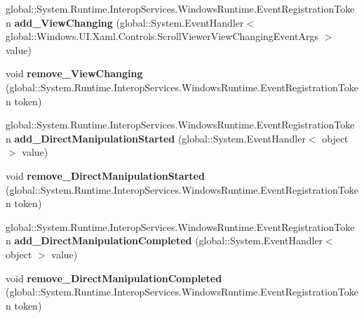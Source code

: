 \begin{DoxyCompactItemize}
global\+::\+System.\+Runtime.\+Interop\+Services.\+Windows\+Runtime.\+Event\+Registration\+Token {\bfseries add\+\_\+\+View\+Changing} (global\+::\+System.\+Event\+Handler$<$ global\+::\+Windows.\+U\+I.\+Xaml.\+Controls.\+Scroll\+Viewer\+View\+Changing\+Event\+Args $>$ value)
\item 
\mbox{\label{class_windows_1_1_u_i_1_1_xaml_1_1_controls_1_1_scroll_viewer_a4ab42f006f295d28bd3080f99f149352}} 
void {\bfseries remove\+\_\+\+View\+Changing} (global\+::\+System.\+Runtime.\+Interop\+Services.\+Windows\+Runtime.\+Event\+Registration\+Token token)
\item 
\mbox{\label{class_windows_1_1_u_i_1_1_xaml_1_1_controls_1_1_scroll_viewer_adab47141d357f03365676f3c0dc8360c}} 
global\+::\+System.\+Runtime.\+Interop\+Services.\+Windows\+Runtime.\+Event\+Registration\+Token {\bfseries add\+\_\+\+Direct\+Manipulation\+Started} (global\+::\+System.\+Event\+Handler$<$ object $>$ value)
\item 
\mbox{\label{class_windows_1_1_u_i_1_1_xaml_1_1_controls_1_1_scroll_viewer_a34f553f86c580da23d4109f5e64d47bc}} 
void {\bfseries remove\+\_\+\+Direct\+Manipulation\+Started} (global\+::\+System.\+Runtime.\+Interop\+Services.\+Windows\+Runtime.\+Event\+Registration\+Token token)
\item 
\mbox{\label{class_windows_1_1_u_i_1_1_xaml_1_1_controls_1_1_scroll_viewer_a5700eed19403dac498a6b0e4c2164043}} 
global\+::\+System.\+Runtime.\+Interop\+Services.\+Windows\+Runtime.\+Event\+Registration\+Token {\bfseries add\+\_\+\+Direct\+Manipulation\+Completed} (global\+::\+System.\+Event\+Handler$<$ object $>$ value)
\item 
\mbox{\label{class_windows_1_1_u_i_1_1_xaml_1_1_controls_1_1_scroll_viewer_abfd26932c4679f145e20ab03785ea8be}} 
void {\bfseries remove\+\_\+\+Direct\+Manipulation\+Completed} (global\+::\+System.\+Runtime.\+Interop\+Services.\+Windows\+Runtime.\+Event\+Registration\+Token token)
\item 
\mbox{\label{class_windows_1_1_u_i_1_1_xaml_1_1_controls_1_1_scroll_viewer_ae43835a1ae5cf186b95dbddb1dec3e35}} 

\end{DoxyCompactItemize}
